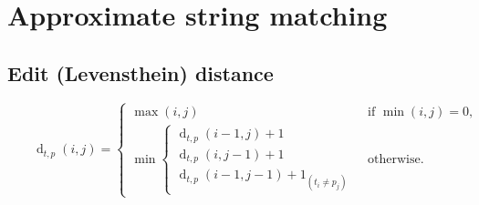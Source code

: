 \chapter{Approximate string matching}

\section{Edit (Levensthein) distance}

\begin{equation*}
  \qquad\operatorname{d}_{t,p}(i,j) =
  \begin{cases}
    \max(i,j) & \text{ if } \min(i,j)=0, \\
    \min
      \begin{cases}
        \operatorname{d}_{t,p}(i-1,j) + 1 \\
        \operatorname{d}_{t,p}(i,j-1) + 1 \\
        \operatorname{d}_{t,p}(i-1,j-1) + 1_{(t_i \neq p_j)}
      \end{cases} & \text{ otherwise.}
  \end{cases}
\end{equation*}


